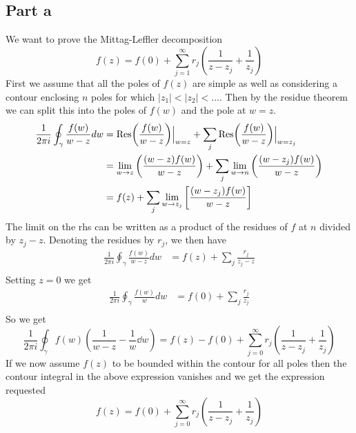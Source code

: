 \documentclass[a4paper,12pt]{article}
\begin{document}
\subsection*{Part a}
We want to prove the Mittag-Leffler decomposition
\begin{equation}
f(z)=f(0)+\sum_{j=1}^{\infty }r_j\left(\frac{1}{z-z_j}+\frac{1}{z_j}\right)
\end{equation}
First we assume that all the poles of $f(z)$ are simple as well as considering a contour enclosing $n$ poles for which $|z_1|<|z_2|<\dots$. Then by the residue theorem we can split this into the poles of $f(w)$ and the pole at $w=z$.
\begin{equation}
\begin{aligned}
\frac{1}{2\pi i}\oint_\gamma \frac{f(w)}{w-z}dw&=\Res(\frac{f(w)}{w-z})\Big|_{w=z}+\sum_j\Res(\frac{f(w)}{w-z})\Big|_{w=z_j}\\
&=\lim_{w\to z}\left(\frac{(w-z)f(w)}{w-z}\right)+\sum_j\lim_{w\to n}\left(\frac{(w-z_j)f(w)}{w-z}\right)\\
&=f(z)+\sum_j\lim_{w\to z_j}\left[\frac{(w-z_j)f(w)}{w-z}\right]\\
\end{aligned}
\end{equation}
The limit on the rhs can be written as a product of the residues of $f$ at $n$ divided by $z_j-z$. Denoting the residues by $r_j$, we then have
\begin{equation}
\begin{aligned}
\frac{1}{2\pi i}\oint_\gamma \frac{f(w)}{w-z}dw&=f(z)+\sum_j\frac{r_j}{z_j-z}\\
\end{aligned}
\end{equation}
Setting $z=0$ we get
\begin{equation}
	\begin{aligned}
		\frac{1}{2\pi i}\oint_\gamma \frac{f(w)}{w}dw&=f(0)+\sum_j\frac{r_j}{z_j}\\
	\end{aligned}
\end{equation}
So we get
\begin{equation}
\frac{1}{2\pi i}\oint_\gamma f(w)\left(\frac{1}{w-z}-\frac{1}{w}\dd w\right)=f(z)-f(0)+\sum_{j=0}^{\infty }r_j\left(\frac{1}{z-z_j}+\frac{1}{z_j}\right)
\end{equation}
If we now assume $f(z)$ to be bounded within the contour for all poles then the contour integral in the above expression vanishes and we get the expression requested
\begin{equation}
f(z)=f(0)+\sum_{j=0}^{\infty }r_j\left(\frac{1}{z-z_j}+\frac{1}{z_j}\right)
\end{equation}
\end{document}
